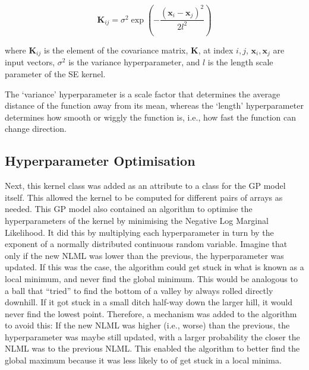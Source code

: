 \documentclass[12pt]{article}
\begin{document}
    \begin{equation}
        \mathbf{K}_{ij} = \sigma^2 \exp\left(-\frac{(\mathbf{x}_i - \mathbf{x}_j)^2}{2l^2}\right) \label{eq:se-kernel}
    \end{equation}

    \noindent where $\mathbf{K}_{ij}$ is the element of the covariance matrix, $\mathbf{K}$, at index $i, j$, $\mathbf{x}_i, \mathbf{x}_j$ are input vectors, $\sigma^2$ is the variance hyperparameter, and $l$ is the length scale parameter of the SE kernel.

    The `variance' hyperparameter is a scale factor that determines the average distance of the function away from its mean, whereas the `length' hyperparameter determines how smooth or wiggly the function is, i.e., how fast the function can change direction.

    \subsection{Hyperparameter Optimisation}
    Next, this kernel class was added as an attribute to a class for the GP model itself.
    This allowed the kernel to be computed for different pairs of arrays as needed.
    This GP model also contained an algorithm to optimise the hyperparameters of the kernel by minimising the Negative Log Marginal Likelihood.
    It did this by multiplying each hyperparameter in turn by the exponent of a normally distributed continuous random variable.
    Imagine that only if the new NLML was lower than the previous, the hyperparameter was updated.
    If this was the case, the algorithm could get stuck in what is known as a local minimum, and never find the global minimum.
    This would be analogous to a ball that ``tried'' to find the bottom of a valley by always rolled directly downhill.
    If it got stuck in a small ditch half-way down the larger hill, it would never find the lowest point.
    Therefore, a mechanism was added to the algorithm to avoid this:
    If the new NLML was higher (i.e., worse) than the previous, the hyperparameter was maybe still updated, with a larger probability the closer the NLML was to the previous NLML.
    This enabled the algorithm to better find the global maximum because it was less likely to of get stuck in a local minima.
\end{document}

